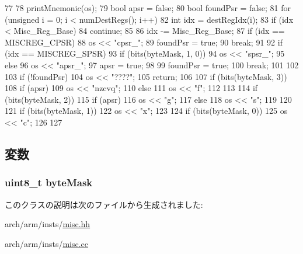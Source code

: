 \begin{DoxyCode}
77 {
78     printMnemonic(os);
79     bool apsr = false;
80     bool foundPsr = false;
81     for (unsigned i = 0; i < numDestRegs(); i++) {
82         int idx = destRegIdx(i);
83         if (idx < Misc_Reg_Base) {
84             continue;
85         }
86         idx -= Misc_Reg_Base;
87         if (idx == MISCREG_CPSR) {
88             os << "cpsr_";
89             foundPsr = true;
90             break;
91         }
92         if (idx == MISCREG_SPSR) {
93             if (bits(byteMask, 1, 0)) {
94                 os << "spsr_";
95             } else {
96                 os << "apsr_";
97                 apsr = true;
98             }
99             foundPsr = true;
100             break;
101         }
102     }
103     if (!foundPsr) {
104         os << "????";
105         return;
106     }
107     if (bits(byteMask, 3)) {
108         if (apsr) {
109             os << "nzcvq";
110         } else {
111             os << "f";
112         }
113     }
114     if (bits(byteMask, 2)) {
115         if (apsr) {
116             os << "g";
117         } else {
118             os << "s";
119         }
120     }
121     if (bits(byteMask, 1)) {
122         os << "x";
123     }
124     if (bits(byteMask, 0)) {
125         os << "c";
126     }
127 }
\end{DoxyCode}


\subsection{変数}
\hypertarget{classMsrBase_a88c8ed0fe728ebc0bbc5182201205bfb}{
\subsubsection[{byteMask}]{\setlength{\rightskip}{0pt plus 5cm}uint8\_\-t {\bf byteMask}}}
\label{classMsrBase_a88c8ed0fe728ebc0bbc5182201205bfb}


このクラスの説明は次のファイルから生成されました:\begin{DoxyCompactItemize}
\item 
arch/arm/insts/\hyperlink{arch_2arm_2insts_2misc_8hh}{misc.hh}\item 
arch/arm/insts/\hyperlink{arch_2arm_2insts_2misc_8cc}{misc.cc}\end{DoxyCompactItemize}

